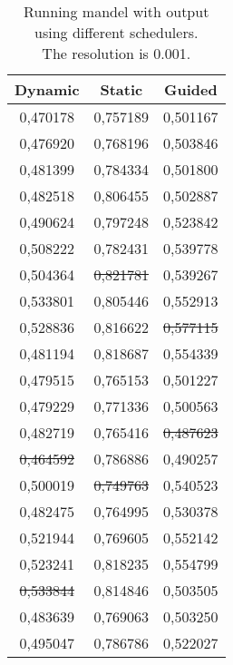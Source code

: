 \documentclass[a4paper]{article}
\begin{document}
\begin{table}[h]
	\caption{Running mandel with output using different schedulers.\\The resolution is 0.001.}
	\label{table:mandel_schedulers}
	\begin{center}
		\begin{tabular}{| c | c | c |}
			\hline
			Dynamic & Static & Guided\\ 
			\hline
			0,470178 & 0,757189 & 0,501167\\ 
			0,476920 & 0,768196 & 0,503846\\ 
			0,481399 & 0,784334 & 0,501800\\ 
			0,482518 & 0,806455 & 0,502887\\ 
			0,490624 & 0,797248 & 0,523842\\ 
			0,508222 & 0,782431 & 0,539778\\ 
			0,504364 & \st{0,821781} & 0,539267\\ 
			0,533801 & 0,805446 & 0,552913\\ 
			0,528836 & 0,816622 & \st{0,577115}\\ 
			0,481194 & 0,818687 & 0,554339\\ 
			0,479515 & 0,765153 & 0,501227\\ 
			0,479229 & 0,771336 & 0,500563\\ 
			0,482719 & 0,765416 & \st{0,487623}\\ 
			\st{0,464592} & 0,786886 & 0,490257\\ 
			0,500019 & \st{0,749763} & 0,540523\\ 
			0,482475 & 0,764995 & 0,530378\\ 
			0,521944 & 0,769605 & 0,552142\\ 
			0,523241 & 0,818235 & 0,554799\\ 
			\st{0,533844} & 0,814846 & 0,503505\\ 
			0,483639 & 0,769063 & 0,503250\\ 
			\hline
			0,495047 & 0,786786 & 0,522027\\ 
			\hline
		\end{tabular}
	\end{center}
\end{table}
\end{document}
